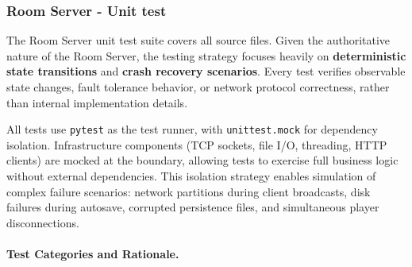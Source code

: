 \subsubsection{Room Server - Unit test}
The Room Server unit test suite covers all source files.
Given the authoritative nature of the Room Server, the testing strategy focuses heavily on \textbf{deterministic state transitions} and \textbf{crash recovery scenarios}.
Every test verifies observable state changes, fault tolerance behavior, or network protocol correctness, rather than internal implementation details.

All tests use \texttt{pytest} \cite{pytest} as the test runner, with \texttt{unittest.mock} for dependency isolation.
Infrastructure components (TCP sockets, file I/O, threading, HTTP clients) are mocked at the boundary, allowing tests to exercise full business logic without external dependencies.
This isolation strategy enables simulation of complex failure scenarios: network partitions during client broadcasts, disk failures during autosave, corrupted persistence files, and simultaneous player disconnections.


\paragraph{Test Categories and Rationale.}

